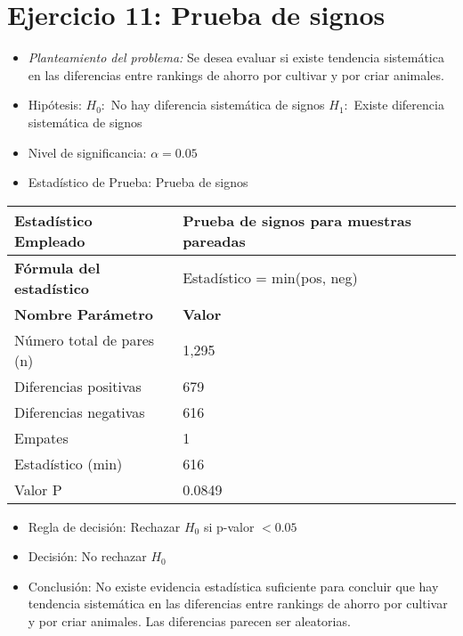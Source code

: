 \documentclass[12pt,a4paper]{article}
\begin{document}
\section*{Ejercicio 11: Prueba de signos}
\begin{itemize}
    \item \textit{Planteamiento del problema:} Se desea evaluar si existe tendencia sistemática en las diferencias entre rankings de ahorro por cultivar y por criar animales.
    \item Hipótesis: \quad $H_{0}:$ No hay diferencia sistemática de signos \hspace{1cm} $H_{1}:$ Existe diferencia sistemática de signos
    \item Nivel de significancia: $\alpha = 0.05$
    \item Estadístico de Prueba: Prueba de signos
\end{itemize}

\begin{tabular}{|m{7cm}|m{7cm}|}
\hline
\textbf{Estadístico Empleado} & Prueba de signos para muestras pareadas \\ \hline
\textbf{Fórmula del estadístico} & Estadístico = min(pos, neg) \\ \hline
\textbf{Nombre Parámetro} & \textbf{Valor} \\ \hline
Número total de pares (n) & 1,295 \\ \hline
Diferencias positivas & 679 \\ \hline
Diferencias negativas & 616 \\ \hline
Empates & 1 \\ \hline
Estadístico (min) & 616 \\ \hline
Valor P & 0.0849 \\ \hline
\end{tabular}

\begin{itemize}
    \item Regla de decisión: Rechazar $H_0$ si p-valor $< 0.05$
    \item Decisión: No rechazar $H_0$
    \item Conclusión: No existe evidencia estadística suficiente para concluir que hay tendencia sistemática en las diferencias entre rankings de ahorro por cultivar y por criar animales. Las diferencias parecen ser aleatorias.
\end{itemize}
\end{document}
